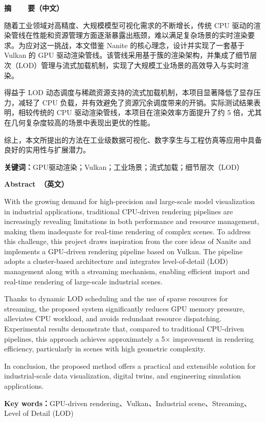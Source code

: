\cleardoublepage{}

\vspace*{-2em}

\begin{center}
    \bfseries {} 摘~~~~要（中文）
\end{center}

随着工业领域对高精度、大规模模型可视化需求的不断增长，传统 CPU 驱动的渲染管线在性能和资源管理方面逐渐暴露出瓶颈，难以满足复杂场景的实时渲染要求。为应对这一挑战，本文借鉴 Nanite 的核心理念，设计并实现了一套基于 Vulkan 的 GPU 驱动渲染管线。该管线采用基于簇的渲染架构，并集成了细节层次（LOD）管理与流式加载机制，实现了大规模工业场景的高效导入与实时渲染。

得益于 LOD 动态调度与稀疏资源支持的流式加载机制，本项目显著降低了显存压力，减轻了 CPU 负载，并有效避免了资源冗余调度带来的开销。实际测试结果表明，相较传统的 CPU 驱动渲染管线，本项目在渲染效率方面提升了约 5 倍，尤其在几何复杂度较高的场景中表现出更优的性能。

综上，本文所提出的方法在工业级数据可视化、数字孪生与工程仿真等应用中具备良好的实用性与扩展潜力。

\vspace{1em}

\noindent\textbf{关键词：}GPU驱动渲染；Vulkan；工业场景；流式加载；细节层次（LOD）

\cleardoublepage{}

\vspace*{-2em}

\begin{center}
    \bfseries {} Abstract~（英文）
\end{center}

With the growing demand for high-precision and large-scale model visualization in industrial applications, traditional CPU-driven rendering pipelines are increasingly revealing limitations in both performance and resource management, making them inadequate for real-time rendering of complex scenes. To address this challenge, this project draws inspiration from the core ideas of Nanite and implements a GPU-driven rendering pipeline based on Vulkan. The pipeline adopts a cluster-based architecture and integrates level-of-detail (LOD) management along with a streaming mechanism, enabling efficient import and real-time rendering of large-scale industrial scenes.

Thanks to dynamic LOD scheduling and the use of sparse resources for streaming, the proposed system significantly reduces GPU memory pressure, alleviates CPU workload, and avoids redundant resource dispatching. Experimental results demonstrate that, compared to traditional CPU-driven pipelines, this approach achieves approximately a 5× improvement in rendering efficiency, particularly in scenes with high geometric complexity.

In conclusion, the proposed method offers a practical and extensible solution for industrial-scale data visualization, digital twins, and engineering simulation applications.

\vspace{1em}

\noindent\textbf{Key words：}GPU-driven rendering、Vulkan、Industrial scene、Streaming、Level of Detail (LOD)